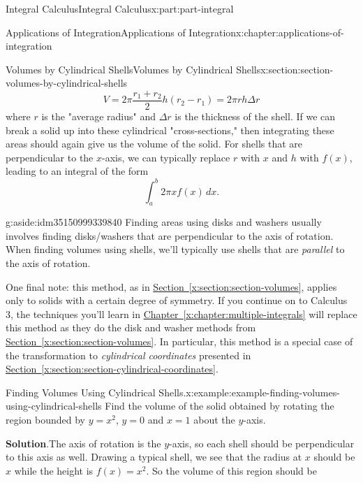 \documentclass[twoside,10pt,]{book}
\newcommand{\blocktitlefont}{\relax}
\newcommand{\xreffont}{\relax}
\numberwithin{equation}{part}
\begin{document}
\begin{partptx}{Integral Calculus}{}{Integral Calculus}{}{}{x:part:part-integral}
\begin{chapterptx}{Applications of Integration}{}{Applications of Integration}{}{}{x:chapter:applications-of-integration}
\begin{sectionptx}{Volumes by Cylindrical Shells}{}{Volumes by Cylindrical Shells}{}{}{x:section:section-volumes-by-cylindrical-shells}
\begin{equation}
V = 2\pi\frac{r_{1} + r_{2}}{2}h(r_{2} - r_{1}) = 2\pi rh\Delta r\label{x:men:equation-volume-cylindrical-shell}
\end{equation}
where \(r\) is the "average radius" and \(\Delta r\) is the thickness of the shell. If we can break a solid up into these cylindrical "cross-sections," then integrating these areas should again give us the volume of the solid. For shells that are perpendicular to the \(x\)-axis, we can typically replace \(r\) with \(x\) and \(h\) with \(f(x)\), leading to an integral of the form%
\begin{equation*}
\int_{a}^{b}2\pi xf(x)\,dx.
\end{equation*}
\begin{aside}{}{g:aside:idm35150999339840}%
Finding areas using disks and washers usually involves finding disks\slash{}washers that are perpendicular to the axis of rotation. When finding volumes using shells, we'll typically use shells that are \emph{parallel} to the axis of rotation.%
\end{aside}
%
\par
One final note: this method, as in \hyperref[x:section:section-volumes]{Section~{\xreffont\ref{x:section:section-volumes}}}, applies only to solids with a certain degree of symmetry. If you continue on to Calculus 3, the techniques you'll learn in \hyperref[x:chapter:multiple-integrals]{Chapter~{\xreffont\ref{x:chapter:multiple-integrals}}} will replace this method as they do the disk and washer methods from \hyperref[x:section:section-volumes]{Section~{\xreffont\ref{x:section:section-volumes}}}. In particular, this method is a special case of the transformation to \emph{cylindrical coordinates} presented in \hyperref[x:section:section-cylindrical-coordinates]{Section~{\xreffont\ref{x:section:section-cylindrical-coordinates}}}.%
\begin{example}{Finding Volumes Using Cylindrical Shells.}{x:example:example-finding-volumes-using-cylindrical-shells}%
Find the volume of the solid obtained by rotating the region bounded by \(y = x^{2}\), \(y = 0\) and \(x = 1\) about the \(y\)-axis.%
\par\smallskip%
\noindent\textbf{\blocktitlefont Solution}.\hypertarget{g:solution:idm35150999333952}{}\quad{}The axis of rotation is the \(y\)-axis, so each shell should be perpendicular to this axis as well. Drawing a typical shell, we see that the radius at \(x\) should be \(x\) while the height is \(f(x) = x^{2}\). So the volume of this region should be%

\end{example}
\end{sectionptx}
\end{chapterptx}
\end{partptx}
\end{document}
